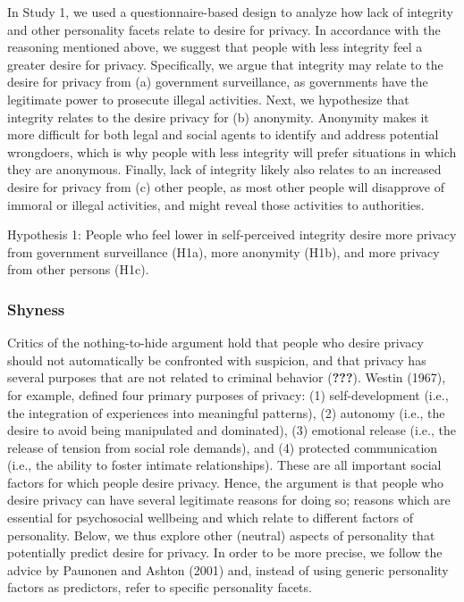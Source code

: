 \documentclass[man]{apa6}
\theoremstyle{definition}
\theoremstyle{definition}
\theoremstyle{definition}
\theoremstyle{remark}
\begin{document}
In Study 1, we used a questionnaire-based design to analyze how lack of
integrity and other personality facets relate to desire for privacy. In
accordance with the reasoning mentioned above, we suggest that people
with less integrity feel a greater desire for privacy. Specifically, we
argue that integrity may relate to the desire for privacy from (a)
government surveillance, as governments have the legitimate power to
prosecute illegal activities. Next, we hypothesize that integrity
relates to the desire privacy for (b) anonymity. Anonymity makes it more
difficult for both legal and social agents to identify and address
potential wrongdoers, which is why people with less integrity will
prefer situations in which they are anonymous. Finally, lack of
integrity likely also relates to an increased desire for privacy from
(c) other people, as most other people will disapprove of immoral or
illegal activities, and might reveal those activities to authorities.

Hypothesis 1: People who feel lower in self-perceived integrity desire
more privacy from government surveillance (H1a), more anonymity (H1b),
and more privacy from other persons (H1c).

\hypertarget{shyness}{%
\subsubsection{Shyness}\label{shyness}}

Critics of the nothing-to-hide argument hold that people who desire
privacy should not automatically be confronted with suspicion, and that
privacy has several purposes that are not related to criminal behavior
({\textbf{???}}). Westin (1967), for example, defined four primary
purposes of privacy: (1) self-development (i.e., the integration of
experiences into meaningful patterns), (2) autonomy (i.e., the desire to
avoid being manipulated and dominated), (3) emotional release (i.e., the
release of tension from social role demands), and (4) protected
communication (i.e., the ability to foster intimate relationships).
These are all important social factors for which people desire privacy.
Hence, the argument is that people who desire privacy can have several
legitimate reasons for doing so; reasons which are essential for
psychosocial wellbeing and which relate to different factors of
personality. Below, we thus explore other (neutral) aspects of
personality that potentially predict desire for privacy. In order to be
more precise, we follow the advice by Paunonen and Ashton (2001) and,
instead of using generic personality factors as predictors, refer to
specific personality facets.
\end{document}
